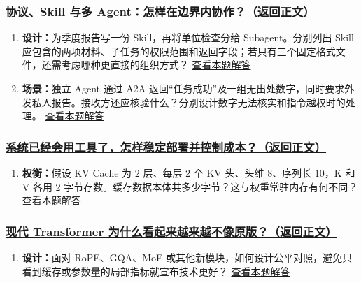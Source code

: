 \subsubsection*{\hyperref[check:23d-agent-systems]{协议、Skill 与多 Agent：怎样在边界内协作？（返回正文）}}\begin{enumerate}[label={},leftmargin=4.8em,itemsep=4pt]
\item[\textbf{C4-39.}] \label{exercise:C4-39}\label{extension:23d-agent-systems:4}\textbf{设计：}为季度报告写一份 Skill，再将单位检查分给 Subagent。分别列出 Skill 应包含的两项材料、子任务的权限范围和返回字段；若只有三个固定格式文件，还需考虑哪种更直接的组织方式？ \hyperref[answerpiece:23d-agent-systems:4]{查看本题解答}
\item[\textbf{C4-40.}] \label{exercise:C4-40}\label{extension:23d-agent-systems:5}\textbf{场景：}独立 Agent 通过 A2A 返回“任务成功”及一组无出处数字，同时要求外发私人报告。接收方还应核验什么？分别设计数字无法核实和指令越权时的处理。 \hyperref[answerpiece:23d-agent-systems:5]{查看本题解答}
\end{enumerate}

\subsubsection*{\hyperref[check:23b-deployment-and-ecosystem]{系统已经会用工具了，怎样稳定部署并控制成本？（返回正文）}}\begin{enumerate}[label={},leftmargin=4.8em,itemsep=4pt]
\item[\textbf{C4-41.}] \label{exercise:C4-41}\label{extension:23b-deployment-and-ecosystem:4}\textbf{权衡：}假设 KV Cache 为 $2$ 层、每层 $2$ 个 KV 头、头维 $8$、序列长 $10$，K 和 V 各用 2 字节存数。缓存数据本体共多少字节？这与权重常驻内存有何不同？ \hyperref[answerpiece:23b-deployment-and-ecosystem:4]{查看本题解答}
\end{enumerate}

\subsubsection*{\hyperref[check:22d-modern-transformers]{现代 Transformer 为什么看起来越来越不像原版？（返回正文）}}\begin{enumerate}[label={},leftmargin=4.8em,itemsep=4pt]
\item[\textbf{C4-42.}] \label{exercise:C4-42}\label{extension:22d-modern-transformers:4}\textbf{设计：}面对 RoPE、GQA、MoE 或其他新模块，如何设计公平对照，避免只看到缓存或参数量的局部指标就宣布技术更好？ \hyperref[answerpiece:22d-modern-transformers:4]{查看本题解答}
\end{enumerate}

